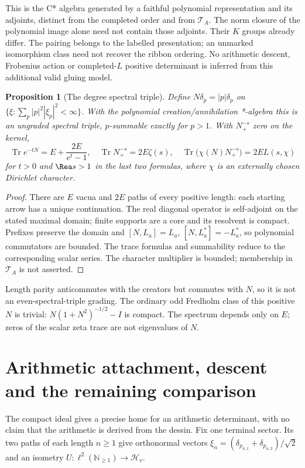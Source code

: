 \documentclass[11pt]{article}
\newtheorem{proposition}[theorem]{Proposition}
\theoremstyle{definition}\newtheorem{definition}[theorem]{Definition}
\theoremstyle{remark}\newtheorem{remark}[theorem]{Remark}
\begin{document}
This is the C* algebra generated by a faithful polynomial representation and its adjoints, distinct from the completed order and from $\mathcal T_A$. The norm closure of the polynomial image alone need not contain those adjoints. Their $K$ groups already differ. The pairing belongs to the labelled presentation; an unmarked isomorphism class need not recover the ribbon ordering. No arithmetic descent, Frobenius action or completed-$L$ positive determinant is inferred from this additional valid gluing model.


\begin{proposition}[The degree spectral triple]\label{thm:degree}
Define $N\delta_p=|p|\delta_p$ on $\{\xi:\sum_p|p|^2|\xi_p|^2<\infty\}$. With the polynomial creation/annihilation *-algebra this is an ungraded spectral triple, $p$-summable exactly for $p>1$. With $N_+^{-s}$ zero on the kernel,
\[
 \operatorname{Tr}e^{-tN}=E+\frac{2E}{e^t-1},\quad
 \operatorname{Tr}N_+^{-s}=2E\zeta(s),\quad
 \operatorname{Tr}\bigl(\chi(N)N_+^{-s}\bigr)=2E L(s,\chi)
\]
for $t>0$ and $\Rea s>1$ in the last two formulas, where $\chi$ is an externally chosen Dirichlet character.
\end{proposition}
\begin{proof}
There are $E$ vacua and $2E$ paths of every positive length: each starting arrow has a unique continuation. The real diagonal operator is self-adjoint on the stated maximal domain; finite supports are a core and its resolvent is compact. Prefixes preserve the domain and $[N,L_a]=L_a$, $[N,L_a^*]=-L_a^*$, so polynomial commutators are bounded. The trace formulas and summability reduce to the corresponding scalar series. The character multiplier is bounded; membership in $\mathcal T_A$ is not asserted.
\end{proof}
Length parity anticommutes with the creators but commutes with $N$, so it is not an even-spectral-triple grading. The ordinary odd Fredholm class of this positive $N$ is trivial: $N(1+N^2)^{-1/2}-I$ is compact. The spectrum depends only on $E$; zeros of the scalar zeta trace are not eigenvalues of $N$.

\section{Arithmetic attachment, descent and the remaining comparison}
The compact ideal gives a precise home for an arithmetic determinant, with no claim that the arithmetic is derived from the dessin. Fix one terminal sector. Its two paths of each length $n\ge1$ give orthonormal vectors $\xi_n=(\delta_{p_{n,1}}+\delta_{p_{n,2}})/\sqrt2$ and an isometry $U:\ell^2(\mathbb N_{\ge1})\to\mathcal H_v$.
\end{document}

